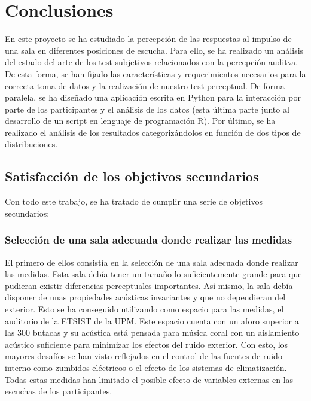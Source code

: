 \documentclass[11pt,a4paper,twoside]{book}
\author{Víctor de Tejada Molera}
\begin{document}
\chapter{Conclusiones}
    En este proyecto se ha estudiado la percepción de las respuestas al impulso de una sala en diferentes posiciones de escucha. Para ello, se ha realizado un análisis del estado del arte de los test subjetivos relacionados con la percepción auditva. De esta forma, se han fijado las características y requerimientos necesarios para la correcta toma de datos y la realización de nuestro test perceptual. De forma paralela, se ha diseñado una aplicación escrita en Python para la interacción por parte de los participantes y el análisis de los datos (esta última parte junto al desarrollo de un script en lenguaje de programación R). Por último, se ha realizado el análisis de los resultados categorizándolos en función de dos tipos de distribuciones.
    
    \section{Satisfacción de los objetivos secundarios}
    
        Con todo este trabajo, se ha tratado de cumplir una serie de objetivos secundarios:
        
        \subsection*{Selección de una sala adecuada donde realizar las medidas}    
            El primero de ellos consistía en la selección de una sala adecuada donde realizar las medidas. Esta sala debía tener un tamaño lo suficientemente grande para que pudieran existir diferencias perceptuales importantes. Así mismo, la sala debía disponer de unas propiedades acústicas invariantes y que no dependieran del exterior. Esto se ha conseguido utilizando como espacio para las medidas, el auditorio de la ETSIST de la UPM. Este espacio cuenta con un aforo superior a las 300 butacas y su acústica está pensada para música coral con un aislamiento acústico suficiente para minimizar los efectos del ruido exterior. Con esto, los mayores desafíos se han visto reflejados en el control de las fuentes de ruido interno como zumbidos eléctricos o el efecto de los sistemas de climatización. Todas estas medidas han limitado el posible efecto de variables externas en las escuchas de los participantes.
        
\end{document}
